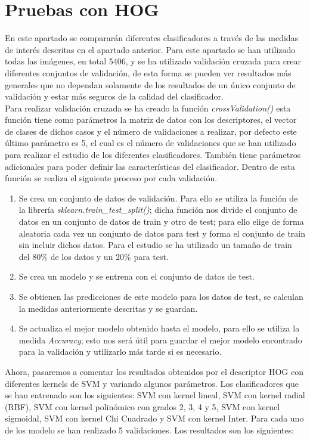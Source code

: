 \section{Pruebas con HOG}
En este apartado se compararán diferentes clasificadores a través de las medidas de interés descritas en el apartado anterior. Para este apartado se han utilizado todas las imágenes, en total 5406, y se ha utilizado validación cruzada para crear diferentes conjuntos de validación, de esta forma se pueden ver resultados más generales que no dependan solamente de los resultados de un único conjunto de validación y estar más seguros de la calidad del clasificador.\\

Para realizar validación cruzada se ha creado la función \textit{crossValidation()} esta función tiene como parámetros la matriz de datos con los descriptores, el vector de clases de dichos casos y el número de validaciones a realizar, por defecto este último parámetro es 5, el cual es el número de validaciones que se han utilizado para realizar el estudio de los diferentes clasificadores. También tiene parámetros adicionales para poder definir las características del clasificador. Dentro de esta función se realiza el siguiente proceso por cada validación.
\begin{enumerate}
	\item Se crea un conjunto de datos de validación. Para ello se utiliza la función de la librería \textit{sklearn.train\_test\_split()}; dicha función nos divide el conjunto de datos en un conjunto de datos de train y otro de test; para ello elige de forma aleatoria cada vez un conjunto de datos para test y forma el conjunto de train sin incluir dichos datos. Para el estudio se ha utilizado un tamaño de train del 80\% de los datos y un 20\% para test.
	\item Se crea un modelo y se entrena con el conjunto de datos de test.
	\item Se obtienen las predicciones de este modelo para los datos de test, se calculan la medidas anteriormente descritas y se guardan.
	\item Se actualiza el mejor modelo obtenido hasta el modelo, para ello se utiliza la medida \textit{Accuracy}; esto nos será útil para guardar el mejor modelo encontrado para la validación y utilizarlo más tarde si es necesario.
\end{enumerate}


Ahora, pasaremos a comentar los resultados obtenidos por el descriptor HOG con diferentes kernels de SVM y variando algunos parámetros. Los clasificadores que se han entrenado son los siguientes: SVM con kernel lineal, SVM con kernel radial (RBF), SVM con kernel polinómico con grados 2, 3, 4 y 5, SVM con kernel sigmoidal, SVM con kernel Chi Cuadrado y SVM con kernel Inter. Para cada uno de los modelo se han realizado 5 validaciones. Los resultados son los siguientes:

